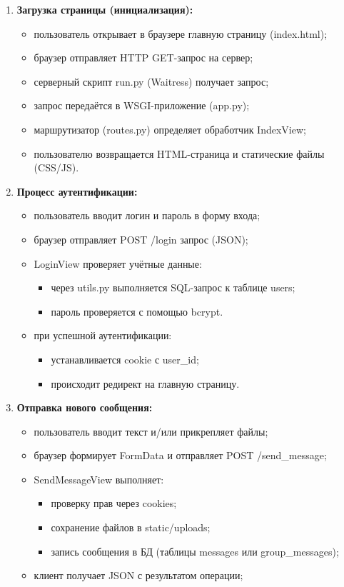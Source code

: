 \begin{enumerate}[leftmargin=*,label=\textbf{\arabic*.}]
	\item \textbf{Загрузка страницы (инициализация):}
	\begin{itemize}
		\item пользователь открывает в браузере главную страницу (index.html);
		\item браузер отправляет HTTP GET-запрос на сервер;
		\item серверный скрипт run.py (Waitress) получает запрос;
		\item запрос передаётся в WSGI-приложение (app.py);
		\item маршрутизатор (routes.py) определяет обработчик IndexView;
		\item пользователю возвращается HTML-страница и статические файлы (CSS/JS).
	\end{itemize}
	
	\item \textbf{Процесс аутентификации:}
	\begin{itemize}
		\item пользователь вводит логин и пароль в форму входа;
		\item браузер отправляет POST /login запрос (JSON);
		\item LoginView проверяет учётные данные:
		\begin{itemize}
			\item через utils.py выполняется SQL-запрос к таблице users;
			\item пароль проверяется с помощью bcrypt.
		\end{itemize}
		\item при успешной аутентификации:
		\begin{itemize}
			\item устанавливается cookie с user\_id;
			\item происходит редирект на главную страницу.
		\end{itemize}
	\end{itemize}
	
	\item \textbf{Отправка нового сообщения:}
	\begin{itemize}
		\item пользователь вводит текст и/или прикрепляет файлы;
		\item браузер формирует FormData и отправляет POST /send\_message;
		\item SendMessageView выполняет:
		\begin{itemize}
			\item проверку прав через cookies;
			\item сохранение файлов в static/uploads;
			\item запись сообщения в БД (таблицы messages или group\_messages);
		\end{itemize}
		\item клиент получает JSON с результатом операции;
	\end{itemize}
	

\end{enumerate}
